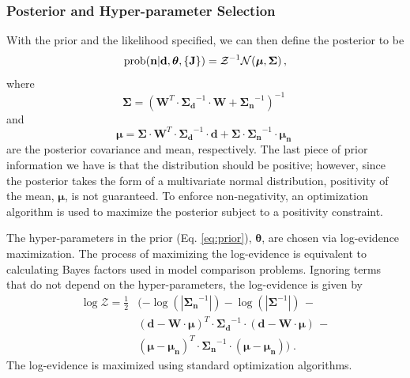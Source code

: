 \subsubsection{Posterior and Hyper-parameter Selection}
With the prior and the likelihood specified, we can then define the posterior to be
\begin{equation}\label{eq:posterior}
    \rm{prob}(\mathbf{n}| \mathbf{d}, \boldsymbol{\theta}, \{\mathbf{J}\}) = \mathcal{Z}^{-1} \mathcal{N}( \boldsymbol{\mu}, \mathbf{\Sigma})\,,
\end{equation}
where
\begin{equation}
    \mathbf{\Sigma} = (\mathbf{W}^T \cdot \mathbf{\Sigma_d}^{-1} \cdot \mathbf{W} + \mathbf{\Sigma_n}^{-1})^{-1} \;  
\end{equation}
and
\begin{equation}
    \boldsymbol{\mu} = \mathbf{\Sigma}\cdot\mathbf{W}^T\cdot\mathbf{\Sigma_d}^{-1} \cdot \mathbf{d} + \mathbf{\Sigma} \cdot \mathbf{\Sigma_n}^{-1} \cdot \boldsymbol{\mu_n}\;
\end{equation}
are the posterior covariance and mean, respectively.
The last piece of prior information we have is that the distribution should be positive; however, since the posterior takes the form of a multivariate normal distribution, positivity of the mean, $\boldsymbol{\mu}$, is not guaranteed.
To enforce non-negativity, an optimization algorithm is used to maximize the posterior subject to a positivity constraint.

The hyper-parameters in the prior (Eq. \ref{eq:prior}), $\boldsymbol{\theta}$, are chosen via log-evidence maximization. The process of maximizing the log-evidence is equivalent to calculating Bayes factors used in model comparison problems.
Ignoring terms that do not depend on the hyper-parameters, the log-evidence is given by
\begin{equation}
\begin{aligned}\label{eq:log_evidence}
    \log{\mathcal{Z}} = \frac{1}{2} &(-\log(|\mathbf{\Sigma_n}^{-1}|) -\log(|\mathbf{\Sigma}^{-1}|)\,- \\
    & (\mathbf{d} - \mathbf{W} \cdot \boldsymbol{\mu})^T \cdot \mathbf{\Sigma_d}^{-1} \cdot (\mathbf{d} - \mathbf{W}\cdot\boldsymbol{\mu})\,- \\
    & (\boldsymbol{\mu} - \boldsymbol{\mu_n})^T \cdot \mathbf{\Sigma_n}^{-1} \cdot (\boldsymbol{\mu} - \boldsymbol{\mu_n}) )\;. 
\end{aligned}
\end{equation}
The log-evidence is maximized using standard optimization algorithms.

